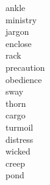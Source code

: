 \documentclass[a4paper, 11pt]{ctexart}
\begin{document}
\begin{multicols*}{3}
\begin{description}
\item[ankle]

\item[ministry]

\item[jargon]

\item[enclose]

\item[rack]

\item[precaution]

\item[obedience]

\item[sway]

\item[thorn]

\item[cargo]

\item[turmoil]

\item[distress]

\item[wicked]

\item[creep]

\item[pond]

    \end{description}
\end{multicols*}
\end{document}

